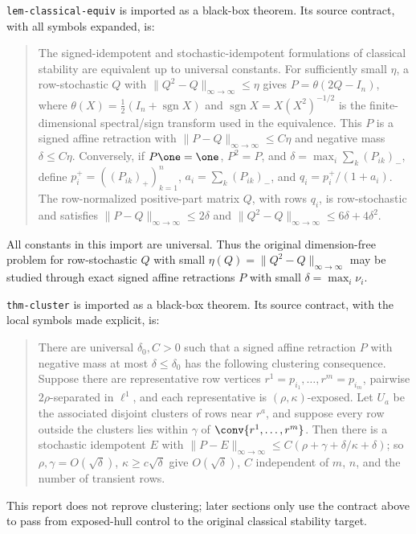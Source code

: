 \begin{proposition}
\provedbadge
\label{prop:classical-equiv-consumed}
\texttt{lem-classical-equiv} is imported as a black-box theorem.  Its
source contract, with all symbols expanded, is:
\begin{quote}\small
The signed-idempotent and stochastic-idempotent formulations of classical
stability are equivalent up to universal constants.  For sufficiently
small \(\eta\), a row-stochastic \(Q\) with
\(\lVert Q^2-Q\rVert_{\infty\to\infty}\leq\eta\) gives
\(P=\theta(2Q-I_n)\), where
\(\theta(X)=\tfrac12(I_n+\operatorname{sgn}X)\) and
\(\operatorname{sgn}X=X(X^2)^{-1/2}\) is the finite-dimensional
spectral/sign transform used in the equivalence.  This \(P\) is a signed affine
retraction with
\(\lVert P-Q\rVert_{\infty\to\infty}\leq C\eta\) and negative mass
\(\delta\leq C\eta\).  Conversely, if \(P\one=\one\), \(P^2=P\), and
\(\delta=\max_i\sum_k(P_{ik})_-\), define
\(p_i^+=((P_{ik})_+)_{k=1}^n\), \(a_i=\sum_k(P_{ik})_-\), and
\(q_i=p_i^+/(1+a_i)\).
The row-normalized positive-part matrix \(Q\), with rows \(q_i\), is
row-stochastic and satisfies
\(\lVert P-Q\rVert_{\infty\to\infty}\leq 2\delta\) and
\(\lVert Q^2-Q\rVert_{\infty\to\infty}\leq 6\delta+4\delta^2\).
\end{quote}
All constants in this import are universal.  Thus the original
dimension-free problem for row-stochastic \(Q\) with small
\(\eta(Q)=\lVert Q^2-Q\rVert_{\infty\to\infty}\) may be studied through
exact signed affine retractions \(P\) with small \(\delta=\max_i\nu_i\).
\end{proposition}

\begin{proposition}
\provedbadge
\label{prop:cluster-consumed}
\texttt{thm-cluster} is imported as a black-box theorem.  Its source
contract, with the local symbols made explicit, is:
\begin{quote}\small
There are universal \(\delta_0,C>0\) such that a signed affine
retraction \(P\) with negative mass at most
\(\delta\leq\delta_0\) has the following clustering consequence.  Suppose
there are representative row vertices
\(r^1=p_{i_1},\ldots,r^m=p_{i_m}\), pairwise
\(2\rho\)-separated in \(\ell^1\), and each representative is
\((\rho,\kappa)\)-exposed.  Let \(U_a\) be the associated disjoint
clusters of rows near \(r^a\), and suppose every row outside the clusters
lies within \(\gamma\) of \(\conv\{r^1,\ldots,r^m\}\).  Then there is a
stochastic idempotent \(E\) with
\(\lVert P-E\rVert_{\infty\to\infty}\leq
C(\rho+\gamma+\delta/\kappa+\delta)\); so
\(\rho,\gamma=O(\sqrt\delta)\), \(\kappa\geq c\sqrt\delta\) give
\(O(\sqrt\delta)\), \(C\) independent of \(m\), \(n\), and the number of
transient rows.
\end{quote}
This report does not reprove clustering; later sections only use the
contract above to pass from exposed-hull control to the original
classical stability target.
\end{proposition}

